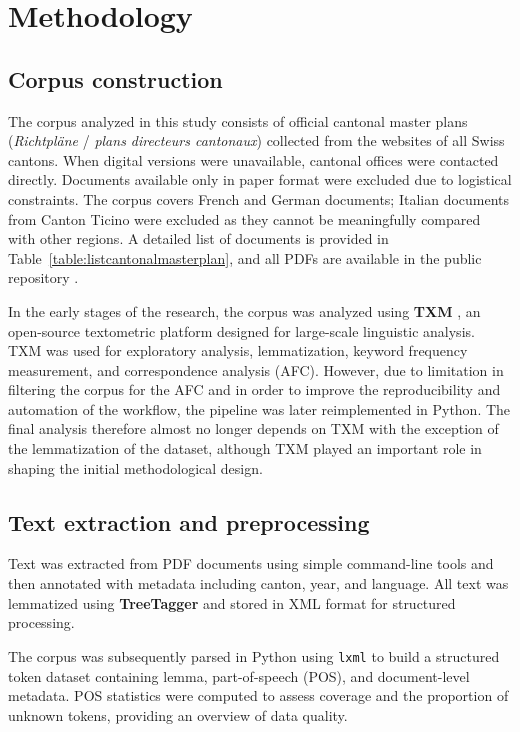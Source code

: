 \section{Methodology}

\subsection{Corpus construction}

The corpus analyzed in this study consists of official cantonal master plans (\textit{Richtpläne} / \textit{plans directeurs cantonaux}) collected from the websites of all Swiss cantons. When digital versions were unavailable, cantonal offices were contacted directly. Documents available only in paper format were excluded due to logistical constraints. The corpus covers French and German documents; Italian documents from Canton Ticino were excluded as they cannot be meaningfully compared with other regions. A detailed list of documents is provided in Table~\ref{table:listcantonalmasterplan}, and all PDFs are available in the public repository \cite{morand_nathmoswissspatialplanningtextometricanalysis_2025}.

In the early stages of the research, the corpus was analyzed using \textbf{TXM} \cite{serge_txm_2010}, an open-source textometric platform designed for large-scale linguistic analysis. TXM was used for exploratory analysis, lemmatization, keyword frequency measurement, and correspondence analysis (AFC). However, due to limitation in filtering the corpus for the AFC and in order to improve the reproducibility and automation of the workflow, the pipeline was later reimplemented in Python. The final analysis therefore almost no longer depends on TXM with the exception of the lemmatization of the dataset, although TXM played an important role in shaping the initial methodological design.

\subsection{Text extraction and preprocessing}

Text was extracted from PDF documents using simple command-line tools and then annotated with metadata including canton, year, and language. All text was lemmatized using \textbf{TreeTagger} \cite{schmid_improvements_1999} and stored in XML format for structured processing.


The corpus was subsequently parsed in Python using \texttt{lxml} to build a structured token dataset containing lemma, part-of-speech (POS), and document-level metadata. POS statistics were computed to assess coverage and the proportion of unknown tokens, providing an overview of data quality.

